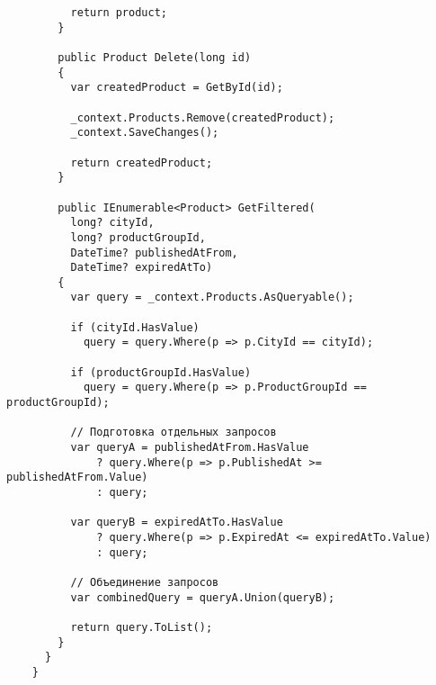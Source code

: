 \begin{lstlisting}
          return product;
        }
    
        public Product Delete(long id)
        {
          var createdProduct = GetById(id);
    
          _context.Products.Remove(createdProduct);
          _context.SaveChanges();
    
          return createdProduct;
        }
    
        public IEnumerable<Product> GetFiltered(
          long? cityId, 
          long? productGroupId, 
          DateTime? publishedAtFrom, 
          DateTime? expiredAtTo)
        {
          var query = _context.Products.AsQueryable();
    
          if (cityId.HasValue)
            query = query.Where(p => p.CityId == cityId);
    
          if (productGroupId.HasValue)
            query = query.Where(p => p.ProductGroupId == productGroupId);
    
          // Подготовка отдельных запросов
          var queryA = publishedAtFrom.HasValue
              ? query.Where(p => p.PublishedAt >= publishedAtFrom.Value)
              : query;
    
          var queryB = expiredAtTo.HasValue
              ? query.Where(p => p.ExpiredAt <= expiredAtTo.Value)
              : query;
    
          // Объединение запросов
          var combinedQuery = queryA.Union(queryB);
    
          return query.ToList();
        }
      }
    }
\end{lstlisting}


